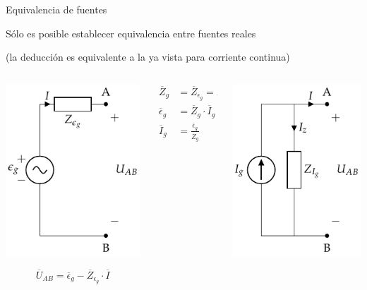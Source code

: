 \documentclass[aspectratio=169, usenames,svgnames,dvipsnames]{beamer}
\begin{document}
\begin{frame}{Equivalencia de fuentes}

    \vspace{3mm}
    Sólo es posible establecer \alert{equivalencia} entre \alert{fuentes reales}

    (la deducción es equivalente a la ya vista para corriente continua)

    \vspace{-2mm}
    \begin{columns}
    \begin{column}{0.33\columnwidth}
    \begin{center}
        \includegraphics[height=0.5\textheight]{../figs/FuenteTensionReal.pdf}
    \end{center}
    \[
      \overline{U}_{AB} = \overline{\epsilon}_g - \overline{Z}_{\epsilon_g} \cdot \overline{I}
    \]
    \end{column}
    \begin{column}{0.33\columnwidth}
    \begin{align*}
      \overline{Z}_g &= \overline{Z}_{\epsilon_g} = \overline{Z}_{I_g}\\[3mm]
      \overline{\epsilon}_g &= \overline{Z}_g \cdot \overline{I}_g\\[3mm]
      \overline{I}_g &= \frac{\overline{\epsilon}_g}{\overline{Z}_g}
    \end{align*}
    \end{column}
    \begin{column}{0.33\columnwidth}
    \begin{center}
        \includegraphics[height=0.5\textheight]{../figs/FuenteCorrienteReal.pdf}

\end{center}
\end{column}
\end{columns}
\end{frame}
\end{document}
